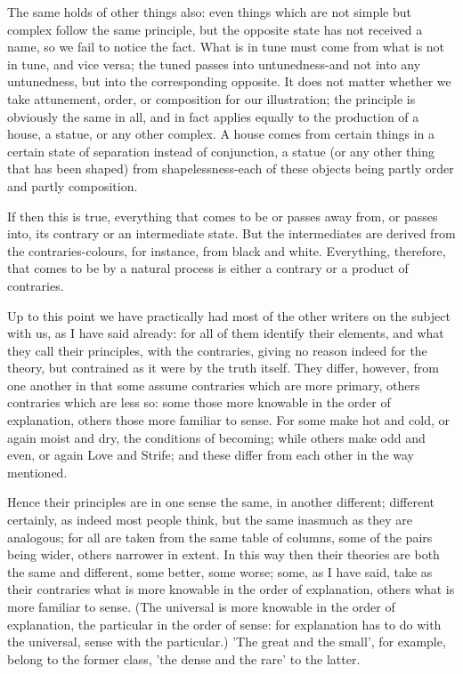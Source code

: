 The same holds of other things also: even things which are not simple
but complex follow the same principle, but the opposite state has
not received a name, so we fail to notice the fact. What is in tune
must come from what is not in tune, and vice versa; the tuned passes
into untunedness-and not into any untunedness, but into the corresponding
opposite. It does not matter whether we take attunement, order, or
composition for our illustration; the principle is obviously the same
in all, and in fact applies equally to the production of a house,
a statue, or any other complex. A house comes from certain things
in a certain state of separation instead of conjunction, a statue
(or any other thing that has been shaped) from shapelessness-each
of these objects being partly order and partly composition.

If then this is true, everything that comes to be or passes away from,
or passes into, its contrary or an intermediate state. But the intermediates
are derived from the contraries-colours, for instance, from black
and white. Everything, therefore, that comes to be by a natural process
is either a contrary or a product of contraries. 

Up to this point we have practically had most of the other writers
on the subject with us, as I have said already: for all of them identify
their elements, and what they call their principles, with the contraries,
giving no reason indeed for the theory, but contrained as it were
by the truth itself. They differ, however, from one another in that
some assume contraries which are more primary, others contraries which
are less so: some those more knowable in the order of explanation,
others those more familiar to sense. For some make hot and cold, or
again moist and dry, the conditions of becoming; while others make
odd and even, or again Love and Strife; and these differ from each
other in the way mentioned. 

Hence their principles are in one sense the same, in another different;
different certainly, as indeed most people think, but the same inasmuch
as they are analogous; for all are taken from the same table of columns,
some of the pairs being wider, others narrower in extent. In this
way then their theories are both the same and different, some better,
some worse; some, as I have said, take as their contraries what is
more knowable in the order of explanation, others what is more familiar
to sense. (The universal is more knowable in the order of explanation,
the particular in the order of sense: for explanation has to do with
the universal, sense with the particular.) 'The great and the small',
for example, belong to the former class, 'the dense and the rare'
to the latter. 

